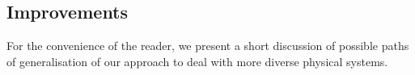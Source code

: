 \subsection{Improvements}





For the convenience of the reader, we present a short discussion of possible paths of generalisation of our approach to deal with more diverse physical systems.

